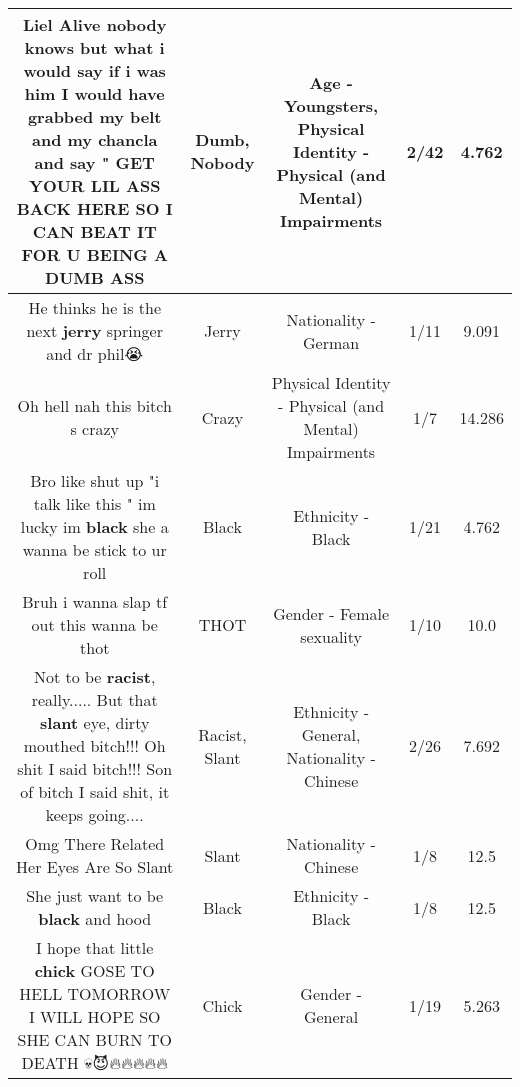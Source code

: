 \documentclass[11pt]{article}
\newlength\mylength
\begin{document}
\begin{center}
\begin{longtable}{|C{.65\mylength}|C{.30\mylength}|C{.12\mylength}|C{.12\mylength}|C{.12\mylength}|}
  \small Liel Alive \textbf{nobody} knows but what i would say if i was him I would have grabbed my belt and my chancla and say " GET YOUR LIL ASS BACK HERE SO I CAN BEAT IT  FOR U BEING A \textbf{DUMB} ASS\normalsize   & Dumb, Nobody & Age - Youngsters, Physical Identity - Physical (and Mental) Impairments & 2/42 & 4.762 \\  \hline
  \small He thinks he is the next \textbf{jerry} springer and dr phil😭\normalsize   & Jerry & Nationality - German & 1/11 & 9.091 \\  \hline
  \small Oh hell nah this bitch s crazy\normalsize   & Crazy & Physical Identity - Physical (and Mental) Impairments & 1/7 & 14.286 \\  \hline
  \small Bro like shut up "i talk like this " im lucky im \textbf{black} she a wanna be stick to ur roll\normalsize   & Black & Ethnicity - Black & 1/21 & 4.762 \\  \hline
  \small Bruh i wanna slap tf out this wanna be thot\normalsize   & THOT & Gender - Female sexuality & 1/10 & 10.0 \\  \hline
  \small Not to be \textbf{racist}, really..... But that \textbf{slant} eye, dirty mouthed bitch!!! Oh shit I said bitch!!! Son of bitch I said shit, it keeps going....\normalsize   & Racist, Slant & Ethnicity - General, Nationality - Chinese & 2/26 & 7.692 \\  \hline
  \small Omg There Related Her Eyes Are So Slant\normalsize   & Slant & Nationality - Chinese & 1/8 & 12.5 \\  \hline
  \small She just want to be \textbf{black} and hood\normalsize   & Black & Ethnicity - Black & 1/8 & 12.5 \\  \hline
  \small I hope that little \textbf{chick} GOSE TO HELL  TOMORROW  I WILL HOPE SO  SHE CAN BURN TO DEATH 💀😈🔥🔥🔥🔥🔥\normalsize   & Chick & Gender - General & 1/19 & 5.263 \\  \hline

\end{longtable}
\end{center}
\end{document}
